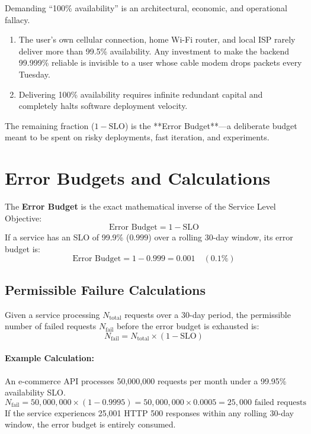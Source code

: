 \begin{commonmistakebox}
Demanding ``100\% availability'' is an architectural, economic, and operational fallacy. 
\begin{enumerate}
  \item The user's own cellular connection, home Wi-Fi router, and local ISP rarely deliver more than 99.5\% availability. Any investment to make the backend 99.999\% reliable is invisible to a user whose cable modem drops packets every Tuesday.
  \item Delivering 100\% availability requires infinite redundant capital and completely halts software deployment velocity.
\end{enumerate}
The remaining fraction ($1 - \text{SLO}$) is the **Error Budget**—a deliberate budget meant to be spent on risky deployments, fast iteration, and experiments.
\end{commonmistakebox}

\section{Error Budgets and Calculations}

The \textbf{Error Budget} is the exact mathematical inverse of the Service Level Objective:
\begin{equation}
\text{Error Budget} = 1 - \text{SLO}
\end{equation}
If a service has an SLO of 99.9\% ($0.999$) over a rolling 30-day window, its error budget is:
\begin{equation}
\text{Error Budget} = 1 - 0.999 = 0.001 \quad (0.1\%)
\end{equation}

\subsection{Permissible Failure Calculations}

Given a service processing $N_{\text{total}}$ requests over a 30-day period, the permissible number of failed requests $N_{\text{fail}}$ before the error budget is exhausted is:
\begin{equation}
N_{\text{fail}} = N_{\text{total}} \times (1 - \text{SLO})
\end{equation}

\paragraph{Example Calculation:}
An e-commerce API processes 50,000,000 requests per month under a 99.95\% availability SLO.
\begin{equation}
N_{\text{fail}} = 50,000,000 \times (1 - 0.9995) = 50,000,000 \times 0.0005 = 25,000 \text{ failed requests}
\end{equation}
If the service experiences 25,001 HTTP 500 responses within any rolling 30-day window, the error budget is entirely consumed.

